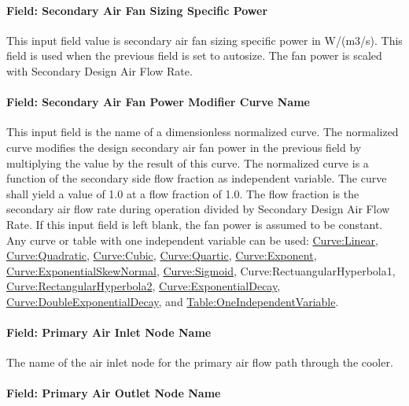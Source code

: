 \paragraph{Field: Secondary Air Fan Sizing Specific Power}\label{field-secondary-air-fan-sizing-specific-power}

This input field value is secondary air fan sizing specific power in W/(m3/s). This field is used when the previous field is set to autosize. The fan power is scaled with Secondary Design Air Flow Rate.

\paragraph{Field: Secondary Air Fan Power Modifier Curve Name}\label{field-secondary-air-fan-power-modifier-curve-name}

This input field is the name of a dimensionless normalized curve. The normalized curve modifies the design secondary air fan power in the previous field by multiplying the value by the result of this curve. The normalized curve is a function of the secondary side flow fraction as independent variable. The curve shall yield a value of 1.0 at a flow fraction of 1.0. The flow fraction is the secondary air flow rate during operation divided by Secondary Design Air Flow Rate. If this input field is left blank, the fan power is assumed to be constant. Any curve or table with one independent variable can be used: \hyperref[curvelinear]{Curve:Linear}, \hyperref[curvequadratic]{Curve:Quadratic}, \hyperref[curvecubic]{Curve:Cubic}, \hyperref[curvequartic]{Curve:Quartic}, \hyperref[curveexponent]{Curve:Exponent}, \hyperref[curveexponentialskewnormal]{Curve:ExponentialSkewNormal}, \hyperref[curvesigmoid]{Curve:Sigmoid}, Curve:RectuangularHyperbola1, \hyperref[curverectangularhyperbola2]{Curve:RectangularHyperbola2}, \hyperref[curveexponentialdecay]{Curve:ExponentialDecay}, \hyperref[curvedoubleexponentialdecay]{Curve:DoubleExponentialDecay}, and \hyperref[tableoneindependentvariable]{Table:OneIndependentVariable}.

\paragraph{Field: Primary Air Inlet Node Name}\label{field-primary-air-inlet-node-name-2}

The name of the air inlet node for the primary air flow path through the cooler.

\paragraph{Field: Primary Air Outlet Node Name}\label{field-primary-air-outlet-node-name-2}

